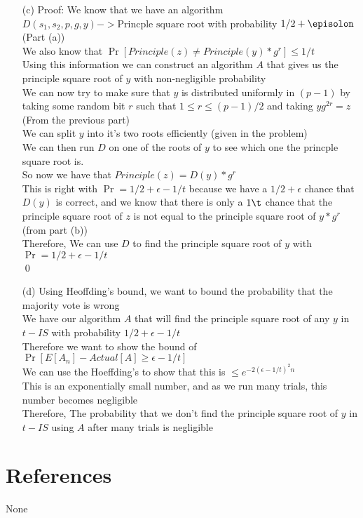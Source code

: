 \documentclass[11pt]{article}
\theoremstyle{definition}
\begin{document}
\begin{enumerate}
	\item[(c)]
	Proof: We know that we have an algorithm $D(s_1,s_2,p,g,y) -> \text{Princple square root}$ with probability $1/2 + \episolon$ (Part (a))\\
	We also know that $\Pr[Principle(z) \neq Principle(y) * g^r] \le 1/t$\\
	Using this information we can construct an algorithm $A$ that gives us the principle square root of $y$ with non-negligible probability\\
	We can now try to make sure that $y$ is distributed uniformly in $(p-1)$ by taking some random bit $r$ such that $1 \le r \le (p-1)/2$ and taking $yg^{2r} = z$ (From the previous part)\\
	We can split $y$ into it's two roots efficiently (given in the problem)\\
	We can then run $D$ on one of the roots of $y$ to see which one the princple square root is.\\
	So now we have that $Principle(z) = D(y) * g^r$\\
	This is right with $\Pr = 1/2 + \epsilon - 1/t$ because we have a $1/2 + \epsilon$ chance that $D(y)$ is correct, and we know that there is only a $1\t$ chance that the principle square root of $z$ is not equal to the principle square root of $y * g^r$ (from part (b))\\
	Therefore, We can use $D$ to find the principle square root of $y$ with $\Pr = 1/2 + \epsilon - 1/t$\\
	\qed

	\item[(d)]
	Using Heoffding's bound, we want to bound the probability that the majority vote is wrong\\
	We have our algorithm $A$ that will find the principle square root of any $y$ in $t-IS$ with probability $1/2 + \epsilon - 1/t$\\
	Therefore we want to show the bound of $\Pr[E[A_n] - Actual[A] \ge \epsilon - 1/t]$\\
	We can use the Hoeffding's to show that this is $\le e^{-2(\epsilon - 1/t)^2n}$\\
	This is an exponentially small number, and as we run many trials, this number becomes negligible\\
	Therefore, The probability that we don't find the principle square root of $y$ in $t-IS$ using $A$ after many trials is negligible\\



\end{enumerate}


\noindent\hrulefill


\section*{References}

None
\end{document}
